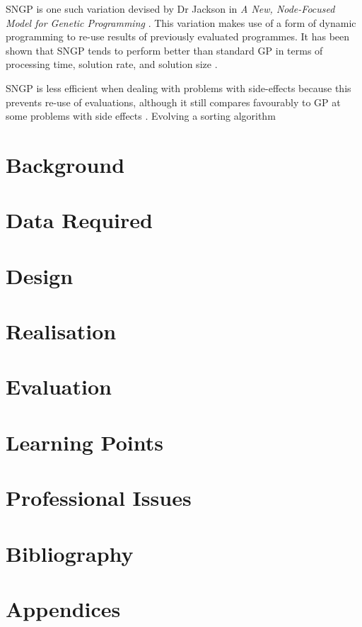 \documentclass{article}
\begin{document}
		SNGP is one such variation devised by Dr Jackson in \textit{A New, Node-Focused Model for Genetic Programming} \cite{jackson_new_2012}. This variation makes use of a form of dynamic programming to re-use results of previously evaluated programmes. It has been shown that SNGP tends to perform better than standard GP in terms of processing time, solution rate, and solution size \cite{jackson_new_2012}. 
		
		SNGP is less efficient when dealing with problems with side-effects because this prevents re-use of evaluations, although it still compares favourably to GP at some problems with side effects \cite{jackson_single_2012}. Evolving a sorting algorithm 
		
	
	\section{Background}
	
		
		
	
	\section{Data Required}
	
	\section{Design}
	
	\section{Realisation}
	
	\section{Evaluation}
	
	\section{Learning Points}
	
	\section{Professional Issues}
	
	\section{Bibliography}
	
		
		
	
	\section{Appendices}
		
\end{document}

